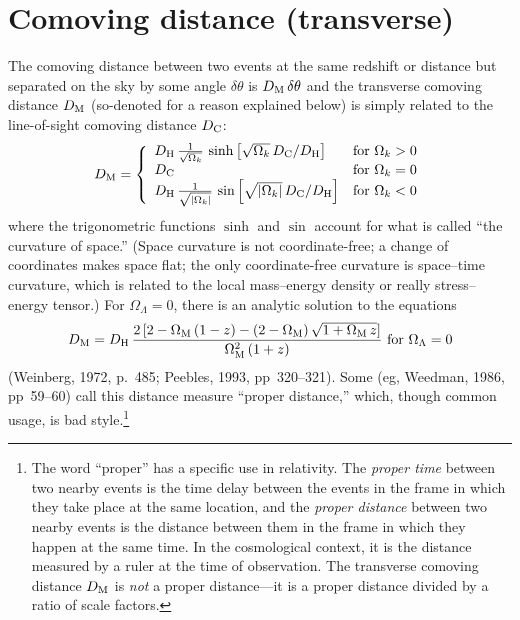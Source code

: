 \section{Comoving distance (transverse)}

The comoving distance between two events at the same redshift or
distance but separated on the sky by some angle $\delta\theta$ is
$D_{\rm M}\,\delta\theta$ and the transverse comoving distance $D_{\rm
M}$ (so-denoted for a reason explained below) is simply related to the
line-of-sight comoving distance $D_{\rm C}$:
\begin{equation}
D_{\rm M} = \left\{
\begin{array}{ll}
D_{\rm H}\,\frac{1}{\sqrt{\Omega_k}}\,\sinh\left[\sqrt{\Omega_k}\,D_{\rm C}/D_{\rm H}\right] & {\rm for}~\Omega_k>0 \\
D_{\rm C} & {\rm for}~\Omega_k=0 \\
D_{\rm H}\,\frac{1}{\sqrt{|\Omega_k|}}\,\sin\left[\sqrt{|\Omega_k|}\,D_{\rm C}/D_{\rm H}\right] & {\rm for}~\Omega_k<0
\end{array}
\right.
\end{equation}
where the trigonometric functions $\sinh$ and $\sin$ account for what
is called ``the curvature of space.''  (Space curvature is not
coordinate-free; a change of coordinates makes space flat; the only
coordinate-free curvature is space--time curvature, which is related
to the local mass--energy density or really stress--energy tensor.)
For $\Omega_{\Lambda}=0$, there is an analytic solution to the
equations
\begin{equation}
D_{\rm M}=D_{\rm H}\,\frac{2\,[2-\Omega_{\rm M}\,(1-z)-
(2-\Omega_{\rm M})\,\sqrt{1+\Omega_{\rm M}\,z}]}{\Omega_{\rm M}^2\,(1+z)}
~{\rm for}~\Omega_{\Lambda}=0
\end{equation}
(Weinberg, 1972, p.~485; Peebles, 1993, pp~320--321).  Some (eg,
Weedman, 1986, pp~59--60) call this distance measure ``proper
distance,'' which, though common usage, is bad style.\footnote{The
word ``proper'' has a specific use in relativity.  The {\em proper
time\/} between two nearby events is the time delay between the events
in the frame in which they take place at the same location, and the
{\em proper distance\/} between two nearby events is the distance
between them in the frame in which they happen at the same time.  In
the cosmological context, it is the distance measured by a ruler at
the time of observation.  The transverse comoving distance $D_{\rm M}$
is {\em not\/} a proper distance---it is a proper distance divided by
a ratio of scale factors.}

